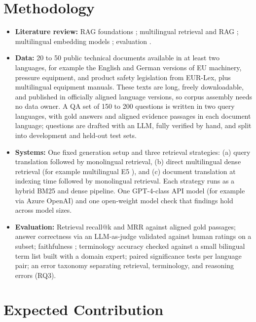 \documentclass[10pt,a4paper]{article}
\begin{document}
\section{Methodology}

\begin{itemize}
    \item \textbf{Literature review:} RAG foundations \cite{lewis2020rag}; multilingual retrieval and RAG \cite{chirkova2024}; multilingual embedding models \cite{wang2024}; evaluation \cite{es2024ragas, ragindustry2025}.
    \item \textbf{Data:} 20 to 50 public technical documents available in at least two languages, for example the English and German versions of EU machinery, pressure equipment, and product safety legislation from EUR-Lex, plus multilingual equipment manuals. These texts are long, freely downloadable, and published in officially aligned language versions, so corpus assembly needs no data owner. A QA set of 150 to 200 questions is written in two query languages, with gold answers and aligned evidence passages in each document language; questions are drafted with an LLM, fully verified by hand, and split into development and held-out test sets.
    \item \textbf{Systems:} One fixed generation setup and three retrieval strategies: (a) query translation followed by monolingual retrieval, (b) direct multilingual dense retrieval (for example multilingual E5 \cite{wang2024}), and (c) document translation at indexing time followed by monolingual retrieval. Each strategy runs as a hybrid BM25 and dense pipeline. One GPT-4-class API model (for example via Azure OpenAI) and one open-weight model check that findings hold across model sizes.
    \item \textbf{Evaluation:} Retrieval recall@k and MRR against aligned gold passages; answer correctness via an LLM-as-judge validated against human ratings on a subset; faithfulness \cite{es2024ragas}; terminology accuracy checked against a small bilingual term list built with a domain expert; paired significance tests per language pair; an error taxonomy separating retrieval, terminology, and reasoning errors (RQ3).
\end{itemize}

\section{Expected Contribution}
\end{document}
